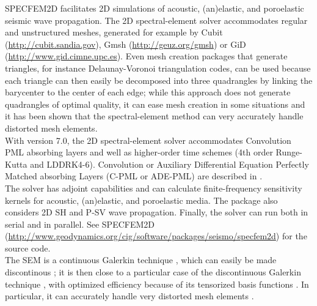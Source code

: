 \documentclass[oneside,english,onecolumn,letterpaper]{book}
\newcommand{\urlwithparentheses}[1]{(\url{#1})}
\begin{document}
SPECFEM2D facilitates 2D simulations of
acoustic, (an)elastic, and poroelastic seismic wave propagation.
The 2D spectral-element solver accommodates
regular and unstructured meshes, generated for example by Cubit
\urlwithparentheses{http://cubit.sandia.gov},
Gmsh \urlwithparentheses{http://geuz.org/gmsh}
or GiD \urlwithparentheses{http://www.gid.cimne.upc.es}.
Even mesh creation packages that generate triangles, for instance Delaunay-Voronoi triangulation codes, can be used because each triangle can then easily be decomposed into three quadrangles by linking the barycenter to the center of each edge; while this approach does not generate quadrangles of optimal quality, it can ease mesh creation in some situations and it has been shown that the spectral-element method can very accurately handle distorted mesh elements.\\

With version 7.0, the 2D spectral-element solver accommodates Convolution PML absorbing layers and well as higher-order time schemes
(4th order Runge-Kutta and LDDRK4-6).
Convolution or Auxiliary Differential Equation Perfectly Matched absorbing Layers (C-PML or ADE-PML)
are described in \cite{MaKoEz08,MaKoGe08,MaKo09,MaKoGeBr10,KoMa07}.\\

The solver has adjoint capabilities and can
calculate finite-frequency sensitivity kernels \citep{TrKoLi08,PeKoLuMaLeCaLeMaLiBlNiBaTr11} for acoustic,
(an)elastic, and poroelastic media. The package also considers 2D SH
and P-SV wave propagation. Finally, the solver can run
both in serial and in parallel. See SPECFEM2D
\urlwithparentheses{http://www.geodynamics.org/cig/software/packages/seismo/specfem2d}
for the source code.\\

The SEM is a continuous Galerkin technique \citep{TrKoLi08,PeKoLuMaLeCaLeMaLiBlNiBaTr11}, which can easily be made discontinous \citep{BeMaPa94,Ch00,KoWoHu02,ChCaVi03,LaWaBe05,Kop06,WiStBuGh10,AcKo11}; it is then close to a particular case of the discontinuous Galerkin technique \citep{ReHi73,LeRa74,Arn82,JoPi86,BoMaHe91,FaRi99,HuHuRa99,CoKaSh00,GiHeWa02,RiWh03,MoRi05,GrScSc06,AiMoMu06,BeLaPi06,DuKa06,DeSeWh08,PuAmKa09,WiStBuGh10,DeSe10,EtChViGl10}, with optimized efficiency because of its tensorized basis functions \citep{WiStBuGh10,AcKo11}.
In particular, it can accurately handle very distorted mesh elements \citep{OlSe11}.\\
\end{document}
